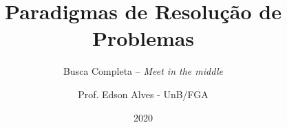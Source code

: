 \title{Paradigmas de Resolução de Problemas}
\subtitle{Busca Completa -- {\it Meet in the middle}}
\author{Prof. Edson Alves - UnB/FGA}
\date{2020}
